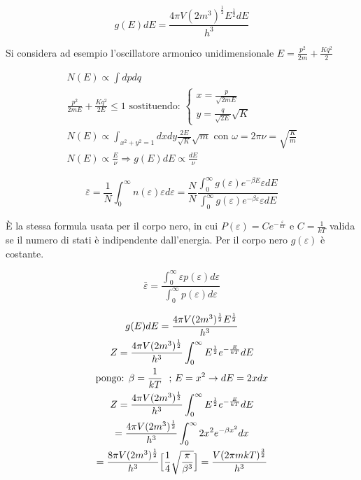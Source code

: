 \begin{equation}\label{ge_de}
g(E) dE = \frac{4 \pi V (2m^3)^{\frac{1}{2}} E^{\frac{1}{2}} dE}{h^3}
\end{equation}


Si considera ad esempio l'oscillatore armonico unidimensionale $ E = \frac{p^2}{2m} + \frac{K q^2}{2} $

\begin{gather*} 
N(E) \propto \int dp dq \\
\frac{p^2}{2mE} + \frac{K q^2}{2E} \leq 1 \mbox{ sostituendo: } 
\begin{cases}
	x = \frac{p}{\sqrt{2mE}} \\
	y = \frac{q}{\sqrt{2E}} \sqrt{K}
\end{cases} \\
N(E) \propto \int_{x^2 + y^2 = 1} dx dy \frac{2E}{\sqrt{K}} \sqrt{m}  \mbox{ con } \omega = 2 \pi \nu = \sqrt{\frac{K}{m}} \\
N(E) \propto \frac{E}{\nu} \Rightarrow g(E)dE \propto \frac{dE}{\nu}
\end{gather*} 

$$ \bar\varepsilon =  \frac{1}{N} \int_0^{\infty} n(\varepsilon) \varepsilon d\varepsilon = \frac{N}{N} \frac{\int_0^{\infty} g(\varepsilon) e^{- \beta E} \varepsilon dE}{\int_0^{\infty} g(\varepsilon) e^{- \beta \varepsilon} \varepsilon dE }$$

È la stessa formula usata per il corpo nero, in cui $P(\varepsilon) = C e^{- \frac{\varepsilon}{k T}} $ e $ C = \frac{1}{k T}$ valida se il numero di stati è indipendente dall'energia. Per il corpo nero $g(\varepsilon)$ è costante.

$$ \bar\varepsilon =   \frac{\int_0^{\infty} \varepsilon p(\varepsilon) d \varepsilon}{\int_0^{\infty} p(\varepsilon) d \varepsilon}$$

\begin{gather*} \label{fun_partizione}
g(E)dE = \frac{4 \pi V (2m^3)^\frac{1}{2}  E^\frac{1}{2} }{ h^3 } \\
Z =  \frac{4 \pi V (2m^3)^\frac{1}{2} }{ h^3 }  \int_0^{\infty}  E^\frac{1}{2} e^{- \frac{E}{k T}}  dE \\
\mbox{pongo: } \beta = \frac{1}{k T} \mbox{ \space ;  }  E = x^2  \rightarrow dE = 2x dx \\
Z =  \frac{4 \pi V (2m^3)^\frac{1}{2} }{ h^3 }  \int_0^{\infty}  E^\frac{1}{2} e^{- \frac{E}{k T}}  dE \\
= \frac{4 \pi V (2m^3)^\frac{1}{2} }{ h^3 } \int_0^{\infty} 2x^2 e^{- \beta x^2 } dx \\
= \frac{8 \pi V (2m^3)^\frac{1}{2} }{ h^3 } \Bigl[  \frac{1}{4} \sqrt{\frac{\pi}{\beta^3}}  \Bigr] 
= \frac{V (2 \pi m k T)^\frac{3}{2}}{h^3}
\end{gather*}

